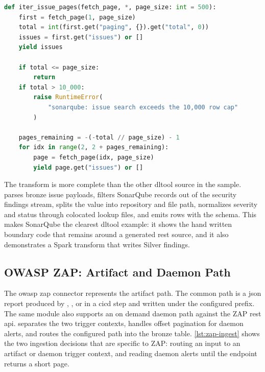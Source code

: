 \begin{lstlisting}[language=Python,caption={[SonarQube issue page iterator]\texttt{src/connectors/sonarqube/ingest.py} (excerpt)},label={lst:sonarqube-ingest}]
def iter_issue_pages(fetch_page, *, page_size: int = 500):
    first = fetch_page(1, page_size)
    total = int(first.get("paging", {}).get("total", 0))
    issues = first.get("issues") or []
    yield issues

    if total <= page_size:
        return
    if total > 10_000:
        raise RuntimeError(
            "sonarqube: issue search exceeds the 10,000 row cap"
        )

    pages_remaining = -(-total // page_size) - 1
    for idx in range(2, 2 + pages_remaining):
        page = fetch_page(idx, page_size)
        yield page.get("issues") or []
\end{lstlisting}

The transform is more complete than the other \gls{dltool} source in the sample.  parses bronze issue payloads, filters SonarQube  records out of the security findings stream, splits the  value into repository and file path, normalizes severity and status through colocated lookup files, and emits rows with the  schema. This makes SonarQube the clearest \gls{dltool} example: it shows the hand written boundary code that remains around a generated \gls{rest} source, and it also demonstrates a Spark transform that writes Silver findings.

\subsection{OWASP ZAP: Artifact and Daemon Path}
\label{sec:impl-zap-connector}

The \gls{owasp} \gls{zap} connector represents the artifact path. The common path is a \gls{json} report produced by , , or  in a \gls{cicd} step and written under the configured  prefix. The same module also supports an on demand daemon path against the ZAP \gls{rest} \gls{api}.  separates the two trigger contexts,  handles offset pagination for daemon alerts, and  routes the configured path into the bronze table. \autoref{lst:zap-ingest} shows the two ingestion decisions that are specific to ZAP: routing an input to an artifact or daemon trigger context, and reading daemon alerts until the endpoint returns a short page.

